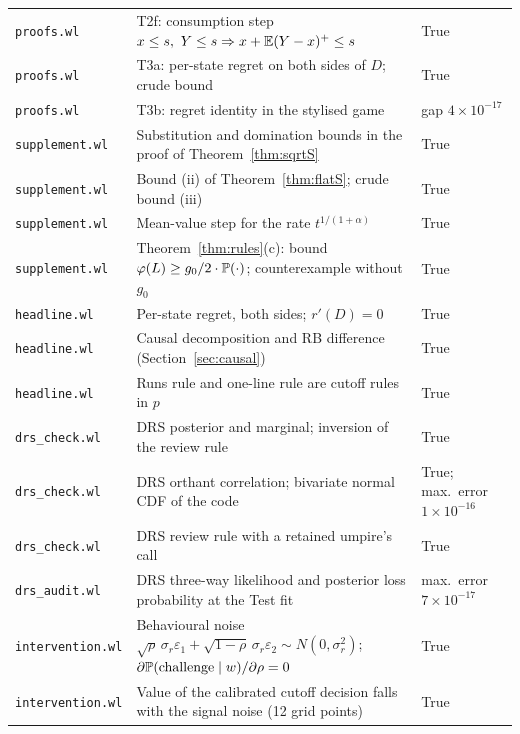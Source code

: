 \begin{tabular}{lp{5.9cm}l}
\texttt{proofs.wl} & T2f: consumption step $x\le s,\ Y\le s\Rightarrow x+\mathbb{E}(Y-x)^+\le s$ & True \\
\texttt{proofs.wl} & T3a: per-state regret on both sides of $D$; crude bound & True \\
\texttt{proofs.wl} & T3b: regret identity in the stylised game & gap $4\times10^{-17}$ \\
\texttt{supplement.wl} & Substitution and domination bounds in the proof of Theorem~\ref{thm:sqrtS} & True \\
\texttt{supplement.wl} & Bound (ii) of Theorem~\ref{thm:flatS}; crude bound (iii) & True \\
\texttt{supplement.wl} & Mean-value step for the rate $t^{1/(1+\alpha)}$ & True \\
\texttt{supplement.wl} & Theorem~\ref{thm:rules}(c): bound $\varphi(L)\ge g_0/2\cdot\mathbb{P}(\cdot)$; counterexample without $g_0$ & True \\
\texttt{headline.wl} & Per-state regret, both sides; $r'(D)=0$ & True \\
\texttt{headline.wl} & Causal decomposition and RB difference (Section~\ref{sec:causal}) & True \\
\texttt{headline.wl} & Runs rule and one-line rule are cutoff rules in $p$ & True \\
\texttt{drs\_check.wl} & DRS posterior and marginal; inversion of the review rule & True \\
\texttt{drs\_check.wl} & DRS orthant correlation; bivariate normal CDF of the code & True; max.\ error $1\times10^{-16}$ \\
\texttt{drs\_check.wl} & DRS review rule with a retained umpire's call & True \\
\texttt{drs\_audit.wl} & DRS three-way likelihood and posterior loss probability at the Test fit & max.\ error $7\times10^{-17}$ \\
\texttt{intervention.wl} & Behavioural noise $\sqrt\rho\,\sigma_r\varepsilon_1+\sqrt{1-\rho}\,\sigma_r\varepsilon_2\sim N(0,\sigma_r^2)$; $\partial\mathbb{P}(\text{challenge}\mid w)/\partial\rho=0$ & True \\
\texttt{intervention.wl} & Value of the calibrated cutoff decision falls with the signal noise (12 grid points) & True \\
\bottomrule
\end{tabular}
